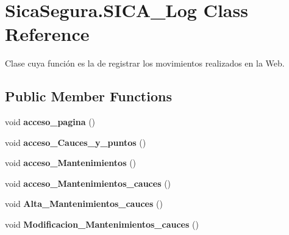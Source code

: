 \hypertarget{class_sica_segura_1_1_s_i_c_a___log}{}\section{Sica\+Segura.\+S\+I\+C\+A\+\_\+\+Log Class Reference}
\label{class_sica_segura_1_1_s_i_c_a___log}


Clase cuya función es la de registrar los movimientos realizados en la Web.  


\subsection*{Public Member Functions}
\begin{DoxyCompactItemize}
\item 
void {\bfseries acceso\+\_\+pagina} ()\hypertarget{class_sica_segura_1_1_s_i_c_a___log_a7bb312304ee61c899f4e95f10d11a699}{}\label{class_sica_segura_1_1_s_i_c_a___log_a7bb312304ee61c899f4e95f10d11a699}

\item 
void {\bfseries acceso\+\_\+\+Cauces\+\_\+y\+\_\+puntos} ()\hypertarget{class_sica_segura_1_1_s_i_c_a___log_a703b1e54d8b837cbc0a00a55209b9f6d}{}\label{class_sica_segura_1_1_s_i_c_a___log_a703b1e54d8b837cbc0a00a55209b9f6d}

\item 
void {\bfseries acceso\+\_\+\+Mantenimientos} ()\hypertarget{class_sica_segura_1_1_s_i_c_a___log_a46d4ec9c82a9a1e32092d35803141475}{}\label{class_sica_segura_1_1_s_i_c_a___log_a46d4ec9c82a9a1e32092d35803141475}

\item 
void {\bfseries acceso\+\_\+\+Mantenimientos\+\_\+cauces} ()\hypertarget{class_sica_segura_1_1_s_i_c_a___log_a75f29e26508ba314e6e87d8a5f48eeb7}{}\label{class_sica_segura_1_1_s_i_c_a___log_a75f29e26508ba314e6e87d8a5f48eeb7}

\item 
void {\bfseries Alta\+\_\+\+Mantenimientos\+\_\+cauces} ()\hypertarget{class_sica_segura_1_1_s_i_c_a___log_a4b2f01844d9bbe383c69fdfb7bca6e55}{}\label{class_sica_segura_1_1_s_i_c_a___log_a4b2f01844d9bbe383c69fdfb7bca6e55}

\item 
void {\bfseries Modificacion\+\_\+\+Mantenimientos\+\_\+cauces} ()\hypertarget{class_sica_segura_1_1_s_i_c_a___log_afb7026c39112be6b6ec4d9de55114876}{}\label{class_sica_segura_1_1_s_i_c_a___log_afb7026c39112be6b6ec4d9de55114876}


\end{DoxyCompactItemize}
